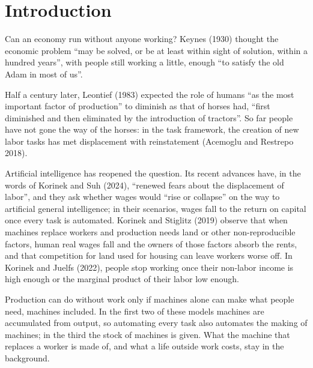 \documentclass[12pt]{article}
\theoremstyle{plain}
\theoremstyle{definition}
\theoremstyle{remark}
\begin{document}
\section{Introduction}\label{sec:intro}

Can an economy run without anyone working? Keynes (1930) thought the economic problem ``may be
solved, or be at least within sight of solution, within a hundred years'', with people still working
a little, enough ``to satisfy the old Adam in most of us''.

Half a century later, Leontief (1983) expected the role of humans ``as the most important factor of
production'' to diminish as that of horses had, ``first diminished and then eliminated by the
introduction of tractors''. So far people have not gone the way of the horses: in the task
framework, the creation of new labor tasks has met displacement with reinstatement (Acemoglu and
Restrepo 2018).

Artificial intelligence has reopened the question. Its recent advances have, in the words of Korinek
and Suh (2024), ``renewed fears about the displacement of labor'', and they ask whether wages would
``rise or collapse'' on the way to artificial general intelligence; in their scenarios, wages fall to
the return on capital once every task is automated. Korinek and Stiglitz (2019) observe that when
machines replace workers and production needs land or other non-reproducible factors, human real
wages fall and the owners of those factors absorb the rents, and that competition for land used for
housing can leave workers worse off. In Korinek and Juelfs (2022), people stop working once their
non-labor income is high enough or the marginal product of their labor low enough.

Production can do without work only if machines alone can make what people need, machines included.
In the first two of these models machines are accumulated from output, so automating every task also
automates the making of machines; in the third the stock of machines is given. What the machine that replaces a worker is made of, and what a life outside work
costs, stay in the background.
\end{document}
